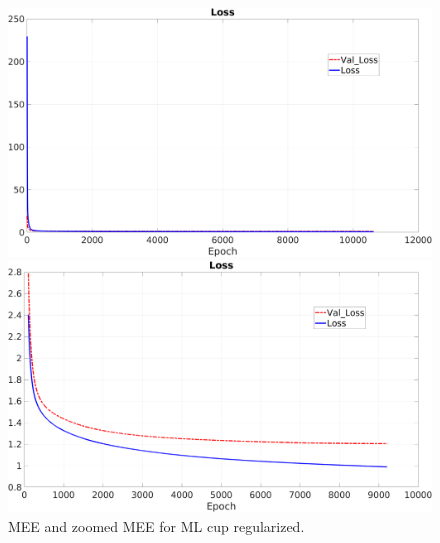 \begin{figure}[H]
    \centering
    \begin{minipage}[t]{0.5\linewidth}
        \includegraphics[width=\linewidth]{img/Cup_loss_Reg_noZoom.png}
    \end{minipage}%
    \begin{minipage}[t]{0.5\linewidth}
        \includegraphics[width=\linewidth]{img/Cup_loss_Reg_Zoom.png}
    \end{minipage}
    \caption{MEE and zoomed MEE for ML cup regularized.}
    \label{img:best}
\end{figure}



